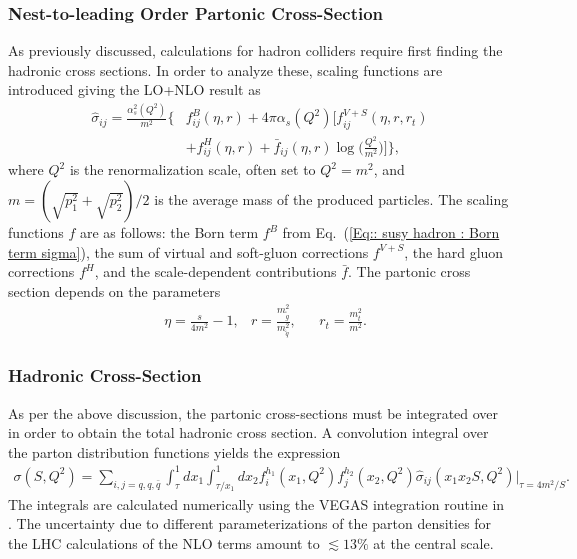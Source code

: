 \documentclass[twoside,english]{uiofysmaster}
\begin{document}
\subsubsection{Nest-to-leading Order Partonic Cross-Section}

As previously discussed, calculations for hadron colliders require first finding the hadronic cross sections. In order to analyze these, scaling functions are introduced \cite{beenakker1997squark} giving the LO+NLO result as
\begin{align}
\hat{\sigma}_{ij} = \frac{\alpha_s^2(Q^2)}{m^2} \Big\{ &f^B_{ij}(\eta, r) + 4 \pi \alpha_s (Q^2) \Bigg[ f_{ij}^{V+S}(\eta, r, r_t) \nonumber \\ & + f_{ij}^H (\eta, r) + \bar{f}_{ij} (\eta, r) \log \Bigg( \frac{Q^2}{m^2}\Bigg) \Bigg] \Big\}
,
\end{align}
where $Q^2$ is the renormalization scale, often set to $Q^2 = m^2$, and $m = (\sqrt{p_1^2} + \sqrt{p_2^2})/2$ is the average mass of the produced particles. The scaling functions $f$ are as follows: the Born term $f^B$ from Eq.~(\ref{Eq:: susy hadron : Born term sigma}), the sum of virtual and soft-gluon corrections $f^{V+S}$, the hard gluon corrections $f^H$, and the scale-dependent contributions $\bar{f}$. The partonic cross section depends on the parameters
\begin{align}
&\eta = \frac{s}{4m^2} -1, &r= \frac{m_{\tilde{g}}^2}{m_{\tilde{q}}^2}, &&r_t = \frac{m_t^2}{m^2}.
\end{align}


\subsubsection{Hadronic Cross-Section}

As per the above discussion, the partonic cross-sections must be integrated over in order to obtain the total hadronic cross section. A convolution integral over the parton distribution functions yields the expression 
\begin{align}
\sigma(S, Q^2) = \sum_{i,j=q, q, \bar{q}} \int_{\tau}^1dx_1 \int_{\tau/x_1}^1 dx_2 f_i^{h_1} (x_1, Q^2) f_j^{h_2}(x_2, Q^2) \hat{\sigma}_{ij} (x_1x_2S, Q^2)\Big|_{\tau=4m^2/S}.
\end{align}
The integrals are calculated numerically using the VEGAS integration routine \cite{PETERLEPAGE1978192} in \cite{beenakker1997squark}.
The uncertainty due to different parameterizations of the parton densities for the LHC calculations of the NLO terms amount to $\lesssim 13 \%$ at the central scale.
\end{document}
